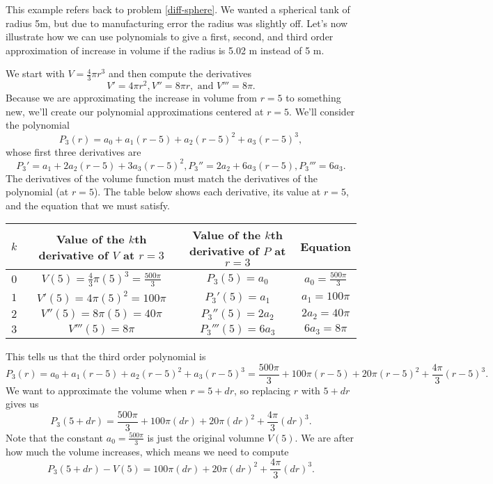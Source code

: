 \begin{example}
This example refers back to problem \ref{diff-sphere}. We wanted a spherical tank of radius 5m, but due to manufacturing error the radius was slightly off. 
Let's now illustrate how we can use polynomials to give a first, second, and third order approximation of increase in volume if the radius is 5.02 m instead of 5 m.  

We start with $V=\frac{4}{3} \pi r^3$ and then compute the derivatives $$V'=4\pi r^2, V''=8\pi r, \text{ and } V'''=8\pi.$$ 
Because we are approximating the increase in volume from $r=5$ to something new, we'll create our polynomial approximations centered at $r=5$. 
We'll consider the polynomial 
$$P_3(r)=a_0+a_1(r-5)+a_2(r-5)^2+a_3(r-5)^3,$$ 
whose first three derivatives are
$$P_3'=a_1+2a_2(r-5)+3a_3(r-5)^2,
P_3''=2a_2+6a_3(r-5),
P_3'''=6a_3.$$
The derivatives of the volume function must match the derivatives of the polynomial (at $r=5$).  The table below shows each derivative, its value at $r=5$, and the equation that we must satisfy.
\begin{center}
\begin{tabular}{|c|c|c|c|}\hline
 $k$ & Value of the $k$th derivative of $V$ at $r=3$ & Value of the $k$th derivative of $P$ at $r=3$ & Equation \\ \hline
 $0$ & $V(5) = \frac{4}{3}\pi (5)^3=\frac{500\pi}{3}$ & $P_3(5) = a_0$ & $a_0=\frac{500\pi}{3}$ \\ \hline
 $1$ & $V'(5) = 4\pi (5)^2=100\pi$ & $P_3'(5) = a_1$ & $a_1=100\pi$ \\ \hline
 $2$ & $V''(5) = 8\pi (5)=40\pi$ & $P_3''(5) = 2a_2$ & $2a_2=40\pi$ \\ \hline
 $3$ & $V'''(5) = 8\pi$ & $P_3'''(5) = 6a_3$ & $6a_3=8\pi$ \\ \hline
\end{tabular}
\end{center}
This tells us that the third order polynomial is 
$$P_3(r)=a_0+a_1(r-5)+a_2(r-5)^2+a_3(r-5)^3
=\frac{500\pi}{3}+100\pi(r-5)+20\pi(r-5)^2+\frac{4\pi}{3}(r-5)^3
.$$ 
We want to approximate the volume when $r=5+dr$, so replacing $r$ with $5+dr$ gives us 
$$P_3(5+dr)=\frac{500\pi}{3}+100\pi(dr)+20\pi(dr)^2+\frac{4\pi}{3}(dr)^3.$$
Note that the constant $a_0=\frac{500\pi}{3}$ is just the original volumne $V(5)$. We are after how much the volume increases, which means we need to compute
$$P_3(5+dr) - V(5)=100\pi(dr)+20\pi(dr)^2+\frac{4\pi}{3}(dr)^3.$$


\end{example}
